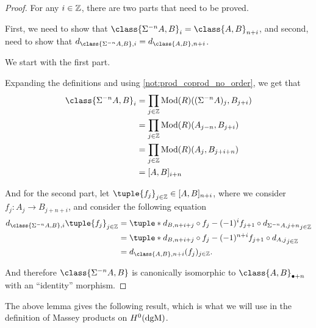 \begin{proof}
    For any \( i \in {\mathbb{Z}} \), there are two parts that need to be proved.

    First, we need to show that \( \class{\Sigma^{-n} A, B}_i = \class{A, B}_{n + i} \), and second, need to show that \( d_{\class{\Sigma^{-n} A, B}, i} = d_{\class{A, B}, n + i} \).

    We start with the first part.

    Expanding the definitions and using \autoref{not:prod_coprod_no_order}, we get that
    \begin{align*}
        \class{\Sigma^{-n} A, B}_i &= \prod_{j \in \Zb} \Mod(R)((\Sigma^{-n} A)_j, B_{j + i}) \\
        &= \prod_{j \in \Zb} \Mod(R)(A_{j - n}, B_{j + i}) \\
        &= \prod_{j \in \Zb} \Mod(R)(A_j, B_{j + i + n}) \\
        &= [A, B]_{i + n}
    \end{align*}

    And for the second part, let \( \tuple{f_j}_{j \in \Zb} \in [A, B]_{n + i} \), where we consider \( f_j: A_j \to B_{j + n + i} \), and consider the following equation
    \begin{align*}
        d_{\class{\Sigma^{-n} A, B}, i}\tuple{f_j}_{j \in \Zb} &= \tuple*{d_{B, n + i + j} \circ f_j - (-1)^i f_{j + 1} \circ d_{\Sigma^{-n} A, j + n}}_{j \in \Zb} \\
        &= \tuple*{d_{B, n + i + j} \circ f_j - (-1)^{n + i} f_{j + 1} \circ d_{A, j}}_{j \in \Zb} \\
        &= d_{\class{A, B}, n + i}(f_j)_{j \in \Zb}.
    \end{align*}

    And therefore \( \class{\Sigma^{-n} A, B} \) is canonically isomorphic to \( \class{A, B}_{\bullet+n} \) with an ``identity'' morphism.
\end{proof}

The above lemma gives the following result, which is what we will use in the definition of Massey products on \( H^0(\operatorname{dgM}) \). 

